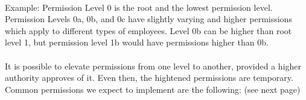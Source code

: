 \documentclass[letterpaper,12pt]{report}
\begin{document}
\paragraph*{}\hspace{0.6cm} Example: Permission Level 0 is the root and the lowest permission level. Permission Levels 0a, 0b, and 0c have slightly varying and higher permissions which apply to different types of employees. Level 0b can be higher than root level 1, but permission level 1b would have permissions higher than 0b.
\paragraph*{}\hspace{0.6cm}It is possible to elevate permissions from one level to another, provided a higher authority approves of it. Even then, the hightened permissions are temporary.\newline
Common permissions we expect to implement are the following: (see next page)
\pagebreak
\end{document}

